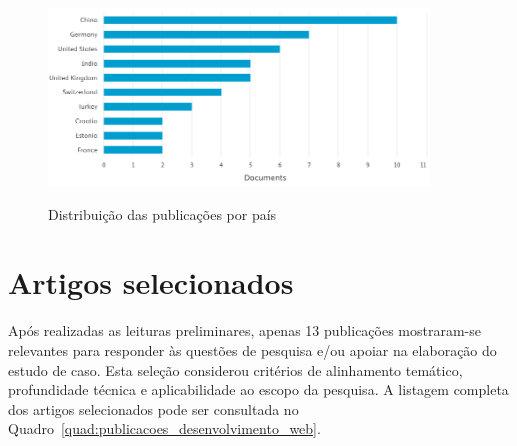 \begin{figure}[H]
    \centering
    \caption{Distribuição das publicações por país}
    \includegraphics[width=0.9\textwidth]{media/docs_by_country.png}
    \label{fig:docs_by_country}
\end{figure}


\section{Artigos selecionados}
\label{section:artigos_selecionados}

Após realizadas as leituras preliminares, apenas 13 publicações mostraram-se relevantes para responder às questões de pesquisa e/ou apoiar na elaboração do estudo de caso. Esta seleção considerou critérios de alinhamento temático, profundidade técnica e aplicabilidade ao escopo da pesquisa. A listagem completa dos artigos selecionados pode ser consultada no Quadro~\ref{quad:publicacoes_desenvolvimento_web}.

